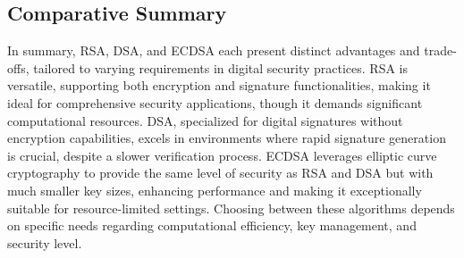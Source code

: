 
\subsection{Comparative Summary}

In summary, RSA, DSA, and ECDSA each present distinct advantages and trade-offs, tailored to varying requirements in digital security practices. RSA is versatile, supporting both encryption and signature functionalities, making it ideal for comprehensive security applications, though it demands significant computational resources. DSA, specialized for digital signatures without encryption capabilities, excels in environments where rapid signature generation is crucial, despite a slower verification process. ECDSA leverages elliptic curve cryptography to provide the same level of security as RSA and DSA but with much smaller key sizes, enhancing performance and making it exceptionally suitable for resource-limited settings. Choosing between these algorithms depends on specific needs regarding computational efficiency, key management, and security level.
